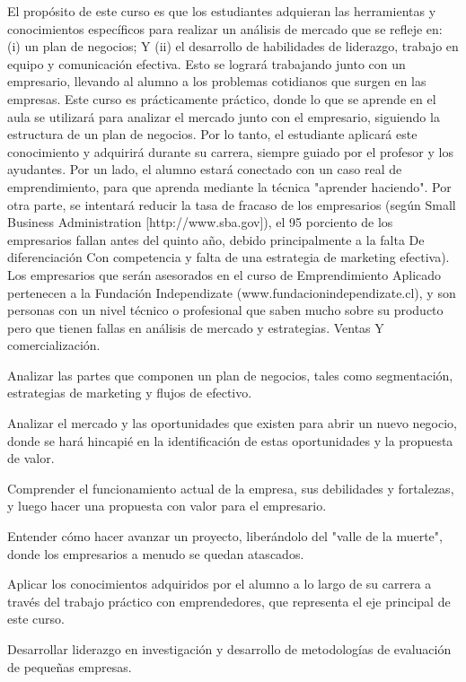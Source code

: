 \begin{syllabus}


\begin{justification}
El propósito de este curso es que los estudiantes adquieran las herramientas y conocimientos específicos para realizar un análisis de mercado que se refleje en: (i) un plan de negocios; Y (ii) el desarrollo de habilidades de liderazgo, trabajo en equipo y comunicación efectiva.
Esto se logrará trabajando junto con un empresario, llevando al alumno a los problemas cotidianos que surgen en las empresas.
Este curso es prácticamente práctico, donde lo que se aprende en el aula se utilizará para analizar el mercado junto con el empresario, siguiendo la estructura de un plan de negocios. Por lo tanto, el estudiante aplicará este conocimiento y adquirirá durante su carrera, siempre guiado por el profesor y los ayudantes.
Por un lado, el alumno estará conectado con un caso real de emprendimiento, para que aprenda mediante la técnica "aprender haciendo". Por otra parte, se intentará reducir la tasa de fracaso de los empresarios (según Small Business Administration [http://www.sba.gov]), el 95 porciento de los empresarios fallan antes del quinto año, debido principalmente a la falta De diferenciación Con competencia y falta de una estrategia de marketing efectiva).
Los empresarios que serán asesorados en el curso de Emprendimiento Aplicado pertenecen a la Fundación Independizate (www.fundacionindependizate.cl), y son personas con un nivel técnico o profesional que saben mucho sobre su producto pero que tienen fallas en análisis de mercado y estrategias. Ventas Y comercialización.
\end{justification}

\begin{goals}
\item Analizar las partes que componen un plan de negocios, tales como segmentación, estrategias de marketing y flujos de efectivo.
\item Analizar el mercado y las oportunidades que existen para abrir un nuevo negocio, donde se hará hincapié en la identificación de estas oportunidades y la propuesta de valor.
\item Comprender el funcionamiento actual de la empresa, sus debilidades y fortalezas, y luego hacer una propuesta con valor para el empresario.
\item Entender cómo hacer avanzar un proyecto, liberándolo del "valle de la muerte", donde los empresarios a menudo se quedan atascados.
\item Aplicar los conocimientos adquiridos por el alumno a lo largo de su carrera a través del trabajo práctico con emprendedores, que representa el eje principal de este curso.
\item Desarrollar liderazgo en investigación y desarrollo de metodologías de evaluación de pequeñas empresas.
\end{goals}


\end{syllabus}
